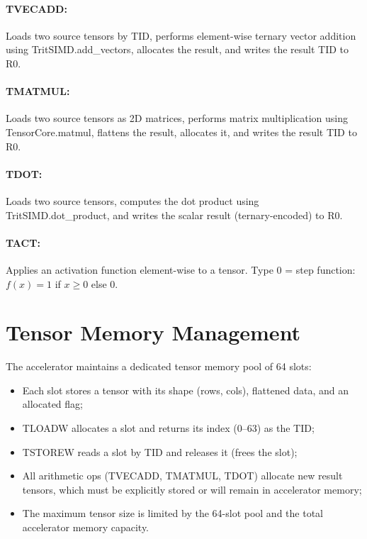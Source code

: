 \documentclass[12pt,a4paper,twoside]{book}
\theoremstyle{trinarytheorem}
\theoremstyle{trinarydefinition}
\newcommand{\code}[1]{\textsf{#1}}
\begin{document}
\paragraph{TVECADD:} Loads two source tensors by TID, performs element-wise ternary
vector addition using \code{TritSIMD.add\_vectors}, allocates the result, and
writes the result TID to R0.

\paragraph{TMATMUL:} Loads two source tensors as 2D matrices, performs matrix
multiplication using \code{TensorCore.matmul}, flattens the result, allocates it,
and writes the result TID to R0.

\paragraph{TDOT:} Loads two source tensors, computes the dot product using
\code{TritSIMD.dot\_product}, and writes the scalar result (ternary-encoded) to R0.

\paragraph{TACT:} Applies an activation function element-wise to a tensor.
Type 0 = step function: $f(x) = 1$ if $x \ge 0$ else $0$.

\section{Tensor Memory Management}

The accelerator maintains a dedicated tensor memory pool of 64 slots:
\begin{itemize}
    \item Each slot stores a tensor with its shape (rows, cols), flattened data, and
          an allocated flag;
    \item TLOADW allocates a slot and returns its index (0--63) as the TID;
    \item TSTOREW reads a slot by TID and releases it (frees the slot);
    \item All arithmetic ops (TVECADD, TMATMUL, TDOT) allocate new result tensors,
          which must be explicitly stored or will remain in accelerator memory;
    \item The maximum tensor size is limited by the 64-slot pool and the total
          accelerator memory capacity.
\end{itemize}
\end{document}
